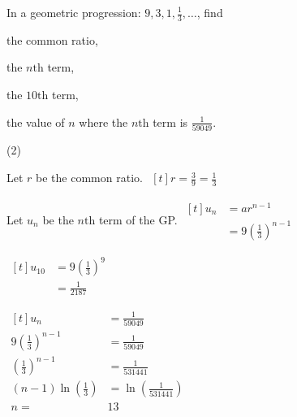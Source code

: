 \documentclass[11pt,a4paper]{book}
\begin{document}
\begin{example}

In a geometric progression: ${\displaystyle 9,3,1,\frac{1}{3},\ldots}$, find

\begin{tasks}[label=(\alph*),label-width=3.5ex]

\task  the common ratio,

\task  the $n\text{th}$ term,

\task  the $10\text{th}$ term,

\task  the value of $n$ where the $n\text{th}$ term is ${\displaystyle \frac{1}{59049}}$.

\end{tasks}

\Solution

\begin{tasks}[label=(\alph*),label-width=3.5ex](2)

\task  Let $r$ be the common ratio.
$
\begin{aligned}[t]
r=\frac{3}{9}=\frac{1}{3}
\end{aligned}
$

\task  Let $u_{n}$ be the $n\text{th}$ term of the GP.
$
\begin{aligned}[t]
u_{n} & =ar^{n-1}\\
 & =9\left(\frac{1}{3}\right)^{n-1}
\end{aligned}
$

\task
$
\begin{aligned}[t]
u_{10} & =9\left(\frac{1}{3}\right)^{9}\\
 & =\frac{1}{2187}
\end{aligned}
$

\task
$
\begin{aligned}[t]
u_{n} & =\frac{1}{59049}\\
9\left(\frac{1}{3}\right)^{n-1} & =\frac{1}{59049}\\
\left(\frac{1}{3}\right)^{n-1} & =\frac{1}{531441}\\
\left(n-1\right)\ln\left(\frac{1}{3}\right) & =\ln\left(\frac{1}{531441}\right)\\
n= & 13
\end{aligned}
$

\end{tasks}

\end{example}
\end{document}
